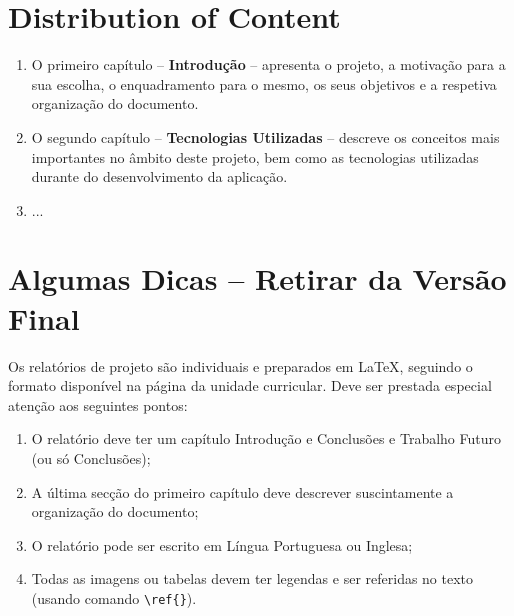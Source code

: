 \section{Distribution of Content}
\label{sec:organ}
\begin{enumerate}
\item O primeiro capítulo -- \textbf{Introdução} -- apresenta o projeto, a motivação para a sua escolha, o enquadramento para o mesmo, os seus objetivos e a respetiva organização do documento.
\item O segundo capítulo -- \textbf{Tecnologias Utilizadas} -- descreve os conceitos mais importantes no âmbito deste projeto, bem como as tecnologias utilizadas durante do desenvolvimento da aplicação.
\item ...
\end{enumerate}

\section{Algumas Dicas -- Retirar da Versão Final}
Os relatórios de projeto são individuais e preparados em \LaTeX, seguindo o formato disponível na página da unidade curricular. Deve ser prestada especial atenção aos seguintes pontos:
\begin{enumerate}
  \item O relatório deve ter um capítulo Introdução e Conclusões e Trabalho Futuro (ou só Conclusões);
  \item A última secção do primeiro capítulo deve descrever suscintamente a organização do documento;
  \item O relatório pode ser escrito em Língua Portuguesa ou Inglesa;
  \item Todas as imagens ou tabelas devem ter legendas e ser referidas no texto (usando comando \texttt{\textbackslash ref\{\}}).
\end{enumerate}
